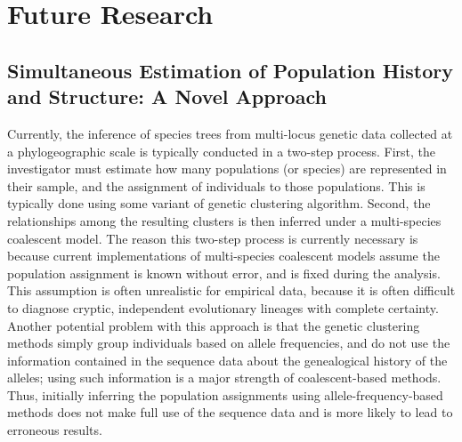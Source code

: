 \documentclass[10pt]{article}
\begin{document}
\section*{Future Research}
\subsection*{Simultaneous Estimation of Population History and Structure: A Novel Approach}
Currently, the inference of species trees from multi-locus genetic data collected at a phylogeographic scale is typically conducted in a two-step process.
First, the investigator must estimate how many populations (or species) are represented in their sample, and the assignment of individuals to those populations.
This is typically done using some variant of genetic clustering algorithm.
Second, the relationships among the resulting clusters is then inferred under a multi-species coalescent model.
The reason this two-step process is currently necessary is because current implementations of multi-species coalescent models assume the population assignment is known without error, and is fixed during the analysis.
This assumption is often unrealistic for empirical data, because it is often difficult to diagnose cryptic, independent evolutionary lineages with complete certainty.
Another potential problem with this approach is that the genetic clustering methods simply group individuals based on allele frequencies, and do not use the information contained in the sequence data about the genealogical history of the alleles; using such information is a major strength of coalescent-based methods.
Thus, initially inferring the population assignments using allele-frequency-based methods does not make full use of the sequence data and is more likely to lead to erroneous results.
\end{document}
